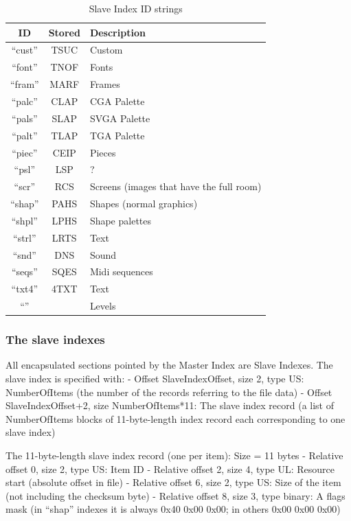 \documentclass{article}
\begin{document}
\begin{table}
\begin{tabular}{ccl}
\hline
 ID    & Stored& Description \\
\hline
 ``cust''& TSUC  & Custom  \\
 ``font''& TNOF  & Fonts \\
 ``fram''& MARF  & Frames \\
 ``palc''& CLAP  & CGA Palette \\
 ``pals''& SLAP  & SVGA Palette \index{palette} \\
 ``palt''& TLAP  & TGA Palette \\
 ``piec''& CEIP  & Pieces   \\
 ``psl'' & LSP\textvisiblespace  & ?  \\
 ``scr'' & RCS\textvisiblespace  & Screens (images that have the full room) \\
 ``shap''& PAHS  & Shapes (normal graphics) \\
 ``shpl''& LPHS  & Shape palettes \\
 ``strl''& LRTS  & Text \\
 ``snd'' & DNS\textvisiblespace  & Sound \\
 ``seqs''& SQES  & Midi sequences \\
 ``txt4''& 4TXT  & Text \\
 ``''    & \textvisiblespace\textvisiblespace\textvisiblespace\textvisiblespace  & Levels \\
\hline
\end{tabular}
\caption{Slave Index ID strings}
\label{slave indexes}
\end{table}

\subsubsection{The slave indexes \label{slave indexes}} %
 All encapsulated sections pointed by the Master Index are Slave Indexes.
 The slave index is specified with:
  - Offset SlaveIndexOffset,   size 2, type US: NumberOfItems
           (the number of the records referring to the file data)
  - Offset SlaveIndexOffset+2, size NumberOfItems*11: The slave index
           record (a list of NumberOfItems blocks of 11-byte-length index
           record each corresponding to one slave index)

 The 11-byte-length slave index record (one per item): Size = 11 bytes
  - Relative offset 0, size 2, type US: Item ID
  - Relative offset 2, size 4, type UL: Resource start
           (absolute offset in file)
  - Relative offset 6, size 2, type US: Size of the item
           (not including the checksum byte)
  - Relative offset 8, size 3, type binary: A flags mask
           (in ``shap'' indexes it is always 0x40 0x00 0x00;
           in others 0x00 0x00 0x00)
\end{document}
